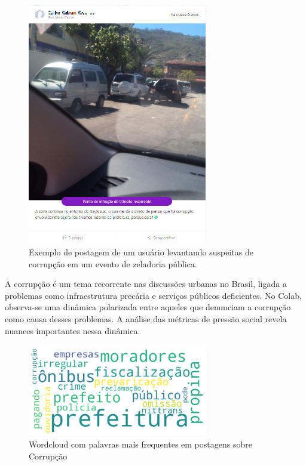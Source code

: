 \begin{figure}[htb]
	\centering
	\includegraphics[width=0.7\textwidth]{images/colab_posts_corruption.png}
	\caption{Exemplo de postagem de um usuário levantando suspeitas de corrupção em um evento de zeladoria pública.}
	\label{fig:colab_posts_corruption}
\end{figure}

A corrupção é um tema recorrente nas discussões urbanas no Brasil, ligada a problemas como infraestrutura precária e serviços públicos deficientes. No Colab, observa-se uma dinâmica polarizada entre aqueles que denunciam a corrupção como causa desses problemas. A análise das métricas de pressão social revela nuances importantes nessa dinâmica.

\begin{figure}[htb]
	\centering
	\includegraphics[width=0.7\textwidth]{images/wordcloud_corruption.png}
	\caption{Wordcloud com palavras mais frequentes em postagens sobre Corrupção}
	\label{fig:wordcloud_corruption}
\end{figure}


